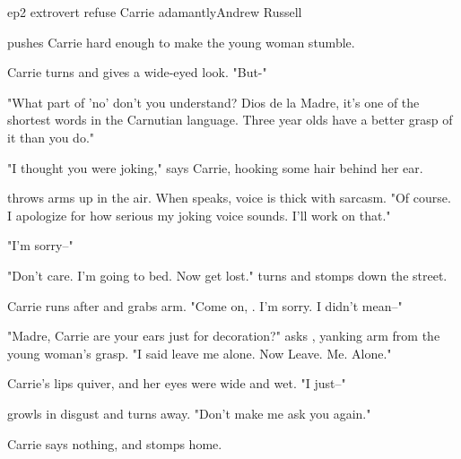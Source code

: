 \documentclass{book}
\begin{document}
\begin{childnode}{ep2 extrovert refuse Carrie adamantly}{Andrew Russell}

    \name{} pushes Carrie hard enough to make the young woman stumble. 

    Carrie turns and gives \name{} a wide-eyed look. "But-"

    "What part of 'no' don't you understand? Dios de la Madre, it's one of the shortest words in the Carnutian language. Three year olds have a better grasp of it than you do."

    "I thought you were joking," says Carrie, hooking some hair behind her ear.

    \name{} throws \hisher{} arms up in the air. When \heshe{} speaks, \hisher{} voice is thick with sarcasm. "Of course. I apologize for how serious my joking voice sounds. I'll work on that."

    "I'm sorry--"

    "Don't care. I'm going to bed. Now get lost." \name{} turns and stomps down the street.

    Carrie runs after \himher{} and grabs \hisher{} arm. "Come on, \name{}. I'm sorry. I didn't mean--"

    "Madre, Carrie are your ears just for decoration?" asks \name{}, yanking \hisher{} arm from the young woman's grasp. "I said leave me alone. Now Leave. Me. Alone." 

    Carrie's lips quiver, and her eyes were wide and wet. "I just--"

    \name{} growls in disgust and turns away. "Don't make me ask you again."

    Carrie says nothing, and \name{} stomps home.




\end{childnode}
\end{document}

